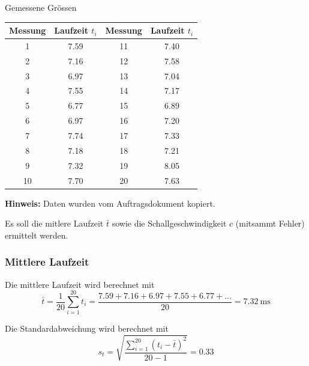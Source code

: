 \begin{center}
    \begin{threeparttable}
        \caption{Gemessene Gr\"ossen}
        \begin{tabular}{cccc}
            \toprule
            Messung & Laufzeit $t_i$ & Messung & Laufzeit $t_i$ \\
            \midrule
            1  & 7.59 & 11 & 7.40 \\
            2  & 7.16 & 12 & 7.58 \\
            3  & 6.97 & 13 & 7.04 \\
            4  & 7.55 & 14 & 7.17 \\
            5  & 6.77 & 15 & 6.89 \\
            6  & 6.97 & 16 & 7.20 \\
            7  & 7.74 & 17 & 7.33 \\
            8  & 7.18 & 18 & 7.21 \\
            9  & 7.32 & 19 & 8.05 \\
            10 & 7.70 & 20 & 7.63 \\
           \bottomrule
        \end{tabular}
        \begin{tablenotes}
            \small
            \item \textbf{Hinweis:} Daten wurden vom Auftragsdokument kopiert.
        \end{tablenotes}
        \label{table:schallgeschwindigkeit}
    \end{threeparttable}
\end{center}

Es soll die mitlere Laufzeit $\bar{t}$ sowie die Schallgeschwindigkeit $c$ (mitsammt Fehler) ermittelt werden.


\subsubsection*{Mittlere Laufzeit}

Die mittlere Laufzeit wird berechnet mit
\begin{equation}
    \bar{t} = \frac{1}{20} \sum_{i=1}^{20} t_i = \frac{7.59+7.16+6.97+7.55+6.77+\ldots}{20} = \SI{7.32}{\milli\second}
\end{equation}

Die Standardabweichung wird berechnet mit
\begin{equation}
    s_t = \sqrt{ \frac{ \sum_{i=1}^{20} (t_i - \bar{t})^2 }{20-1} } = 0.33
\end{equation}

